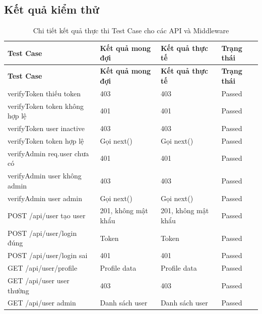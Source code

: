 \subsection{Kết quả kiểm thử}
\renewcommand{\arraystretch}{1.4}
\setlength{\tabcolsep}{8pt}
\begin{longtable}{|p{}|p{}|p{}|p{}|}
\caption{Chi tiết kết quả thực thi Test Case cho các API và Middleware}\label{tab:test_case_results}\\[15pt]
\hline
\textbf{Test Case} & \textbf{Kết quả mong đợi} & \textbf{Kết quả thực tế} & \textbf{Trạng thái} \\ \hline
\endfirsthead

\hline
\textbf{Test Case} & \textbf{Kết quả mong đợi} & \textbf{Kết quả thực tế} & \textbf{Trạng thái} \\ \hline
\endhead

\hline
\endfoot
\endlastfoot

verifyToken thiếu token & 403 & 403 & Passed \\ \hline
verifyToken token không hợp lệ & 401 & 401 & Passed \\ \hline
verifyToken user inactive & 403 & 403 & Passed \\ \hline
verifyToken token hợp lệ & Gọi next() & Gọi next() & Passed \\ \hline

verifyAdmin req.user chưa có & 401 & 401 & Passed \\ \hline
verifyAdmin user không admin & 403 & 403 & Passed \\ \hline
verifyAdmin user admin & Gọi next() & Gọi next() & Passed \\ \hline

POST /api/user tạo user & 201, không mật khẩu & 201, không mật khẩu & Passed \\ \hline
POST /api/user/login đúng & Token & Token & Passed \\ \hline
POST /api/user/login sai & 401 & 401 & Passed \\ \hline

GET /api/user/profile & Profile data & Profile data & Passed \\ \hline
GET /api/user user thường & 403 & 403 & Passed \\ \hline
GET /api/user admin & Danh sách user & Danh sách user & Passed \\ \hline


\end{longtable}
